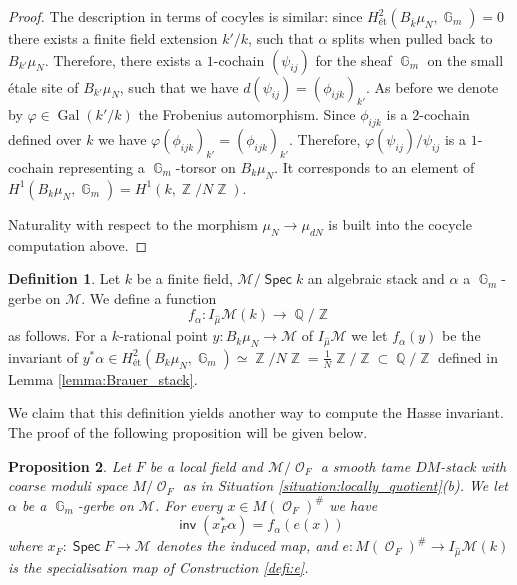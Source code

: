 \documentclass{article}
\DeclareMathOperator{\Hom}{\mathsf{Hom}}
\DeclareMathOperator{\inv}{\mathsf{inv}}
\DeclareMathOperator{\Zb}{\mathbb{Z}}
\DeclareMathOperator{\Gal}{Gal}
\DeclareMathOperator{\G}{\mathbb{G}}
\newcommand{\Mc}{\mathcal{M}}
\DeclareMathOperator{\Spec}{\mathsf{Spec}}
\DeclareMathOperator{\Hhom}{\underline{\Hom}}
\DeclareMathOperator{\Oo}{\mathcal{O}}
\DeclareMathOperator{\Qb}{\mathbb{Q}}
\theoremstyle{definition}
\newtheorem{definition}{Definition}[section]
\theoremstyle{plain}
\newtheorem{proposition}[definition]{Proposition}
\begin{document}
\begin{proof}
The description in terms of cocyles is similar: since $H^2_{\text{\'et}}(B_{\bar{k}}\mu_N,\G_m) = 0$ there exists a finite field extension $k'/k$, such that $\alpha$ splits when pulled back to $B_{k'}\mu_N$. Therefore, there exists a $1$-cochain $(\psi_{ij})$ for the sheaf $\G_m$ on the small \'etale site of $B_{k'}\mu_N$, such that we have $d(\psi_{ij}) = (\phi_{ijk})_{k'}$. As before we denote by $\varphi\in \Gal(k'/k)$ the Frobenius automorphism. Since $\phi_{ijk}$ is a $2$-cochain defined over $k$ we have
$\varphi(\phi_{ijk})_{k'} = (\phi_{ijk})_{k'}$. Therefore, $\varphi(\psi_{ij})/\psi_{ij}$ is a $1$-cochain representing a $\G_m$-torsor on $B_{k}\mu_N$. It corresponds to an element of $H^1(B_k\mu_N,\G_m) = H^1(k,\Zb/N\Zb)$.

Naturality with respect to the morphism $\mu_N \to \mu_{dN}$ is built into the cocycle computation above.
\end{proof}



\begin{definition}
Let $k$ be a finite field, $\Mc/\Spec k$ an algebraic stack and $\alpha$ a $\G_m$-gerbe on $\Mc$. We define a function 
$$f_{\alpha}\colon I_{\widehat{\mu}}\Mc(k) \to \Qb/\Zb$$
as follows. For a $k$-rational point $y\colon B_k\mu_N \to \Mc$ of $I_{\widehat{\mu}}\Mc$ we let $f_{\alpha}(y)$ be the invariant of $y^*\alpha \in H^2_{\text{\'et}}(B_k\mu_N,\G_m) \simeq \Zb/N\Zb = \frac{1}{N}\Zb/\Zb \subset \Qb/\Zb$ defined in Lemma \ref{lemma:Brauer_stack}. 
\end{definition}

We claim that this definition yields another way to compute the Hasse invariant. The proof of the following proposition will be given below.
\begin{proposition}\label{prop:hasse2}
Let $F$ be a local field and $\Mc/\Oo_F$ a smooth tame $DM$-stack with coarse moduli space $M/\Oo_F$ as in Situation \ref{situation:locally_quotient}(b). We let $\alpha$ be a $\G_m$-gerbe on $\Mc$. For every $x \in M(\Oo_F)^{\#}$ we have 
$$\inv(x_F^*\alpha) = f_{\alpha}\left(e(x)\right)$$
where $x_F\colon \Spec F \to \Mc$ denotes the induced map, and $e\colon M(\Oo_F)^{\#} \to I_{\widehat{\mu}}\Mc(k)$ is the specialisation map of Construction \ref{defi:e}.
\end{proposition}
\end{document}

